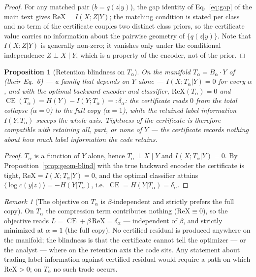 \documentclass{article}
\theoremstyle{plain}
\newtheorem{proposition}{Proposition}[section]
\theoremstyle{remark}
\newtheorem{remark}{Remark}[section]
\DeclareMathOperator{\CE}{CE}
\begin{document}
\begin{proof}
For any matched pair ($b = q(z|y)$), the gap identity of Eq.~\eqref{eq:gap} of the
main text gives $\mathrm{ReX} = I(X;Z|Y)$; the matching condition is stated per class
and no term of the certificate couples two distinct class priors, so the certificate
value carries no information about the pairwise geometry of $\{q(z|y)\}$. Note that
$I(X;Z|Y)$ is generally non-zero; it vanishes only under the conditional independence
$Z \perp X \mid Y$, which is a property of the encoder, not of the prior.
\end{proof}

\begin{proposition}[Retention blindness on $T_\alpha$]
\label{prop:flat}
On the manifold $T_\alpha = B_\alpha \cdot Y$ of \citet{kolchinsky2019caveats}
(their Eq.~6) --- a family that depends on $Y$ alone --- $I(X;T_\alpha|Y) = 0$ for
every $\alpha$, and with the optimal backward encoder and classifier,
$\mathrm{ReX}(T_\alpha) = 0$ and
$\CE(T_\alpha) = H(Y) - I(Y;T_\alpha) =: \delta_\alpha$: the certificate reads $0$
from the total collapse ($\alpha = 0$) to the full copy ($\alpha = 1$), while the
retained label information $I(Y;T_\alpha)$ sweeps the whole axis. Tightness of the
certificate is therefore compatible with retaining all, part, or none of $Y$ --- the
certificate records nothing about how much label information the code retains.
\end{proposition}

\begin{proof}
$T_\alpha$ is a function of $Y$ alone, hence $T_\alpha \perp X \mid Y$ and
$I(X;T_\alpha|Y) = 0$. By Proposition~\ref{prop:geom-blind} with the true backward
encoder the certificate is tight, $\mathrm{ReX} = I(X;T_\alpha|Y) = 0$, and the optimal
classifier attains $\langle \log c(y|z)\rangle = -H(Y|T_\alpha)$, i.e.\
$\CE = H(Y|T_\alpha) = \delta_\alpha$.
\end{proof}

\begin{remark}[The objective on $T_\alpha$ is $\beta$-independent and strictly prefers the full copy]
\label{rem:flatness}
On $T_\alpha$ the compression term contributes nothing ($\mathrm{ReX} \equiv 0$), so
the objective reads $L = \CE + \beta\,\mathrm{ReX} = \delta_\alpha$ --- independent of
$\beta$, and strictly minimized at $\alpha = 1$ (the full copy). No certified residual
is produced anywhere on the manifold; the blindness is that the certificate cannot
tell the optimizer --- or the analyst --- where on the retention axis the code sits.
Any statement about trading label information against certified residual would require
a path on which $\mathrm{ReX} > 0$; on $T_\alpha$ no such trade occurs.
\end{remark}
\end{document}

